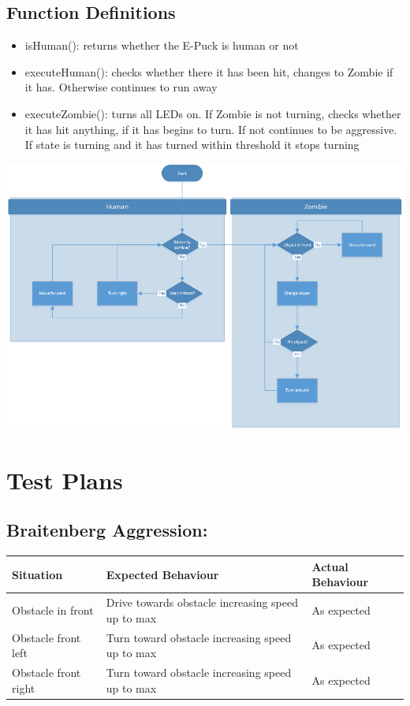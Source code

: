 \documentclass[11pt]{article}
\begin{document}
\subsection*{Function Definitions}

\begin{itemize}
\item{isHuman(): returns whether the E-Puck is human or not}
\item{executeHuman(): checks whether there it has been hit, changes to Zombie if it has. Otherwise continues to run away}
\item{executeZombie(): turns all LEDs on. If Zombie is not turning, checks whether it has hit anything, if it has begins to turn. If not continues to be aggressive. If state is turning and it has turned within threshold it stops turning}
\end{itemize}

\includegraphics[width=1.4\textwidth, angle=-90]{ZombieInfection.png}

\section*{Test Plans}

\subsection*{Braitenberg Aggression:}


\begin{center}
\begin{tabular}{ | p{5cm} | p{5cm} | p{5cm} |}
	\hline
	\textbf{Situation} & \textbf{Expected Behaviour} & \textbf{Actual Behaviour} \\
    \hline
	Obstacle in front & Drive towards obstacle increasing speed up to max & As expected \\
	\hline
	Obstacle front left & Turn toward obstacle increasing speed up to max & As expected \\
	\hline
	Obstacle front right & Turn toward obstacle increasing speed up to max & As expected \\
	\hline
\end{tabular}
\end{center}
\end{document}
